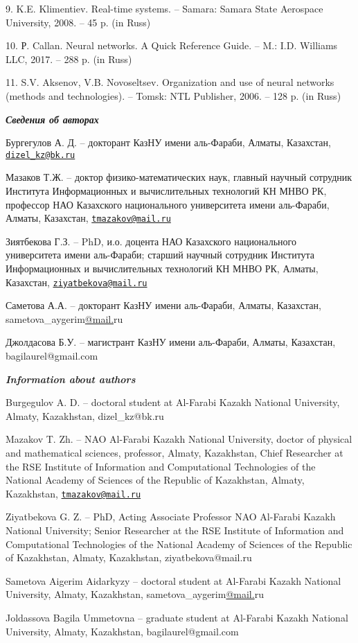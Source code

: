 9. K.E. Klimentiev. Real-time systems. -- Samara: Samara State Aerospace
University, 2008. -- 45 p. (in Russ)

10. Р. Callan. Neural networks. A Quick Reference Guide. -- M.: I.D.
Williams LLC, 2017. -- 288 p. (in Russ)

11. S.V. Aksenov, V.B. Novoseltsev. Organization and use of neural
networks (methods and technologies). -- Tomsk: NTL Publisher, 2006. --
128 p. (in Russ)

\emph{{\bfseries Сведения об авторах}}

Бургегулов А. Д. -- докторант КазНУ имени аль-Фараби, Алматы, Казахстан,
\href{mailto:dizel_kz@bk.ru}{\nolinkurl{dizel\_kz@bk.ru}}

Мазаков Т.Ж. -- доктор физико-математических наук, главный научный
сотрудник Института Информационных и вычислительных технологий КН МНВО
РК, профессор НАО Казахского национального университета имени
аль-Фараби, Алматы, Казахстан,
\href{mailto:tmazakov@mail.ru}{\nolinkurl{tmazakov@mail.ru}}

Зиятбекова Г.З. -- PhD, и.о. доцента НАО Казахского национального
университета имени аль-Фараби; старший научный сотрудник Института
Информационных и вычислительных технологий КН МНВО РК, Алматы,
Казахстан,
\href{mailto:ziyatbekova@mail.ru}{\nolinkurl{ziyatbekova@mail.ru}}

Саметова А.А. -- докторант КазНУ имени аль-Фараби, Алматы, Казахстан,
sametova\_aygerim\href{mailto:amirkhanov.b@gmail.com}{@mail.}ru

Джолдасова Б.У. -- магистрант КазНУ имени аль-Фараби, Алматы, Казахстан,
bagilaurel@gmail.com

\emph{{\bfseries Information about authors}}

Burgegulov A. D. -- doctoral student at Al-Farabi Kazakh National
University, Almaty, Kazakhstan, dizel\_kz@bk.ru

Mazakov T. Zh. -- NAO Al-Farabi Kazakh National University, doctor of
physical and mathematical sciences, professor, Almaty, Kazakhstan, Chief
Researcher at the RSE Institute of Information and Computational
Technologies of the National Academy of Sciences of the Republic of
Kazakhstan, Almaty, Kazakhstan,
\href{mailto:tmazakov@mail.ru}{\nolinkurl{tmazakov@mail.ru}}

Ziyatbekova G. Z. -- PhD, Acting Associate Professor NAO Al-Farabi
Kazakh National University; Senior Researcher at the RSE Institute of
Information and Computational Technologies of the National Academy of
Sciences of the Republic of Kazakhstan, Almaty, Kazakhstan,
ziyatbekova@mail.ru

Sametova Aigerim Aidarkyzy -- doctoral student at Al-Farabi Kazakh
National University, Almaty, Kazakhstan,
sametova\_aygerim\href{mailto:amirkhanov.b@gmail.com}{@mail.}ru

Joldassova Bagila Ummetovna -- graduate student at Al-Farabi Kazakh
National University, Almaty, Kazakhstan, bagilaurel@gmail.com
